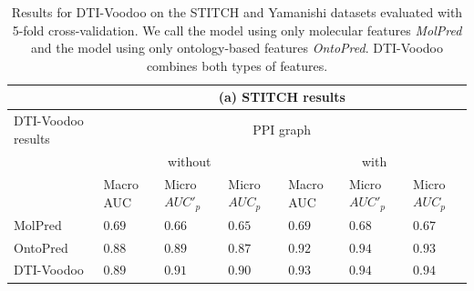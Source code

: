 \documentclass[]{article}
\newcommand{\name}{DTI-Voodoo}
\begin{document}
\begin{table}[ht]
	\centering
	\begin{tabular}{|p{1.4cm}|p{0.6cm}|p{0.7cm}|p{0.7cm}|p{0.6cm}|p{0.7cm}|p{0.7cm}|}
		\hline
		&\multicolumn{6}{c|}{(a) STITCH results}\\
		\hline
		\name{} results&\multicolumn{6}{c|}{PPI graph}\\
		&\multicolumn{3}{c|}{without}&\multicolumn{3}{c|}{with}\\
		&Macro AUC&Micro $AUC'_p$&Micro $AUC_p$&Macro AUC&Micro $AUC'_p$&Micro $AUC_p$\\
		\hline
		MolPred&$0.69$&$0.66$&$0.65$&$0.69$&$0.68$&$0.67$\\
		\hline
		OntoPred&$0.88$&$0.89$&$0.87$&$0.92$&$0.94$&$0.93$\\
		\hline
		\name{} & $0.89$& $0.91$ & $0.90$&$\mathbf{0.93}$&$\mathbf{0.94}$&$\mathbf{0.94}$\\
		\hline
	\end{tabular}
	\caption{\label{tab:Results}Results for \name{} on the STITCH
		and Yamanishi datasets evaluated with 5-fold cross-validation. We 
		call the model using only molecular features
		\textit{MolPred} and the model using only ontology-based
		features \textit{OntoPred}. \name{} combines both types of
		features.}
\end{table}
\end{document}
